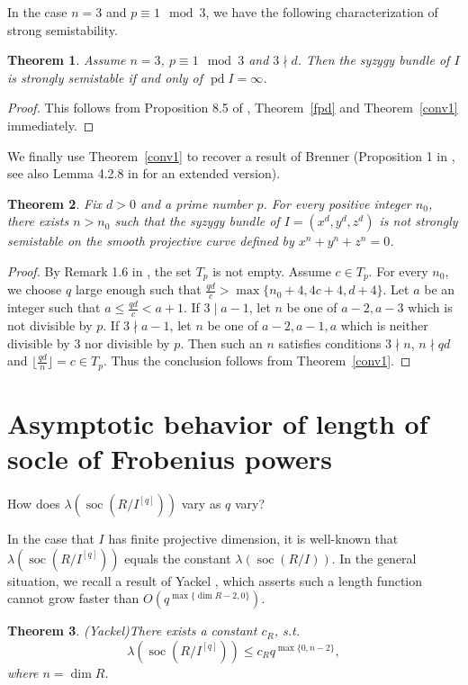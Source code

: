 \documentclass[draft]{amsart}
\newtheorem{theorem}{Theorem}[section]
\theoremstyle{definition}
\numberwithin{equation}{theorem}
\begin{document}
In the case $n=3$ and $p \equiv 1 \mod 3$, we have the following characterization of strong semistability.
\begin{theorem}
Assume $n=3$, $p \equiv 1 \mod 3$ and $3 \nmid d$. Then the syzygy bundle of $I$ is strongly semistable if and only of ${\mathop{\mathrm{pd}}\nolimits} I={{\infty}}$.
\end{theorem} 
\begin{proof}
This follows from Proposition 8.5 of \cite{KRV}, Theorem~\ref{fpd} and Theorem~\ref{conv1} immediately. 
\end{proof}
\noindent We finally use Theorem~\ref{conv1} to recover a result of Brenner (Proposition 1 in \cite{B4}, see also Lemma 4.2.8 in \cite{K} for an extended version). 
\begin{theorem}Fix $d>0$ and a prime number $p$. For every positive integer $n_0$, there exists $n>n_0$ such that the syzygy bundle of $I=(x^d,y^d,z^d)$ is not strongly semistable on the smooth projective curve defined by $x^n+y^n+z^n=0$.
\end{theorem}
\begin{proof}
By Remark 1.6 in \cite{KRV}, the set $T_p$ is not empty. Assume $c \in T_p$. For every $n_0$, we choose $q$ large enough such that $\frac{qd}{c}>\max\{n_0+4, 4c+4, d+4\}$. Let $a$ be an integer such that $a\leq \frac{qd}{c} <a+1$. If $3 \mid a-1$, let $n$ be one of $a-2,a-3$ which is not divisible by $p$. If $3 \nmid a-1$, let $n$ be one of $a-2, a-1, a$ which is neither divisible by $3$ nor divisible by $p$. Then such an $n$ satisfies conditions $3 \nmid n$, $n \nmid qd$ and ${{\lfloor}}\frac{qd}{n}{{\rfloor}} =c \in T_p$. Thus the conclusion follows from Theorem~\ref{conv1}.
\end{proof}

\section{Asymptotic behavior of length of socle of Frobenius powers}\label{sl}
 

How does ${\lambda} ({\operatorname{soc}} (R/I^{[q]}))$ vary as $q$ vary?

In the case that $I$ has finite projective dimension, it is well-known that ${\lambda} ({\operatorname{soc}} (R/I^{[q]}))$ equals the constant ${\lambda} ({\operatorname{soc}} (R/I))$.   
In the general situation, we recall a result of Yackel \cite{Y},  which asserts such a length function cannot grow faster than $O(q^{\max\{\dim R-2,0\}})$.
\begin{theorem}(Yackel)\label{Yackel}
There exists a constant $c_R$, s.t.
\[\lambda ({\operatorname{soc}}(R/I^{[q]})) \leq c_Rq^{\max\{0, n-2\}},\]
where $n=\dim R$.
\end{theorem}
\end{document}
